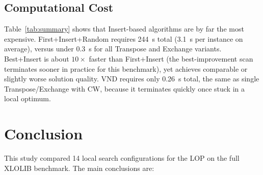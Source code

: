 \documentclass[11pt,a4paper]{article}
\begin{document}
\subsection{Computational Cost}

Table~\ref{tab:summary} shows that Insert-based algorithms are by far
the most expensive.  First+Insert+Random requires 244~s total (3.1~s per
instance on average), versus under 0.3~s for all Transpose and Exchange
variants.  Best+Insert is about $10\times$ faster than First+Insert (the
best-improvement scan terminates sooner in practice for this benchmark),
yet achieves comparable or slightly worse solution quality.  VND requires
only 0.26~s total, the same as single Transpose/Exchange with CW, because
it terminates quickly once stuck in a local optimum.

\section{Conclusion}
\label{sec:conclusion}

This study compared 14 local search configurations for the LOP on the
full XLOLIB benchmark.  The main conclusions are:
\end{document}

